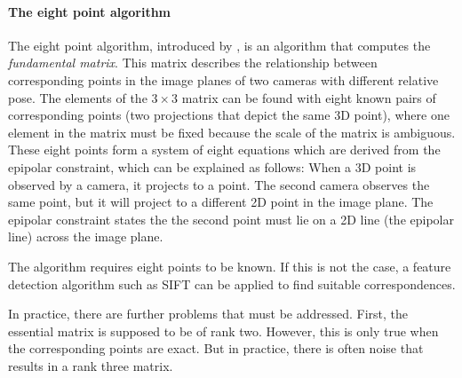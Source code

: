 			\paragraph{The eight point algorithm}
				The eight point algorithm, introduced by \cite{longuet1981}, is an algorithm that computes the \emph{fundamental matrix}.
				This matrix describes the relationship between corresponding points in the image planes of two cameras with different relative pose.
				The elements of the $3 \times 3$ matrix can be found with eight known pairs of corresponding points (two projections that depict the same 3D point), where one element in the matrix must be fixed because the scale of the matrix is ambiguous.
				These eight points form a system of eight equations which are derived from the epipolar constraint, which can be explained as follows:
				When a 3D point is observed by a camera, it projects to a point. 
				The second camera observes the same point, but it will project to a different 2D point in the image plane.
				The epipolar constraint states the the second point must lie on a 2D line (the epipolar line) across the image plane.
				
				The algorithm requires eight points to be known.
				If this is not the case, a feature detection algorithm such as {SIFT} can be applied to find suitable correspondences.
				
				In practice, there are further problems that must be addressed. 
				First, the essential matrix is supposed to be of rank two. 
				However, this is only true when the corresponding points are exact.
				But in practice, there is often noise that results in a rank three matrix.
				
			
